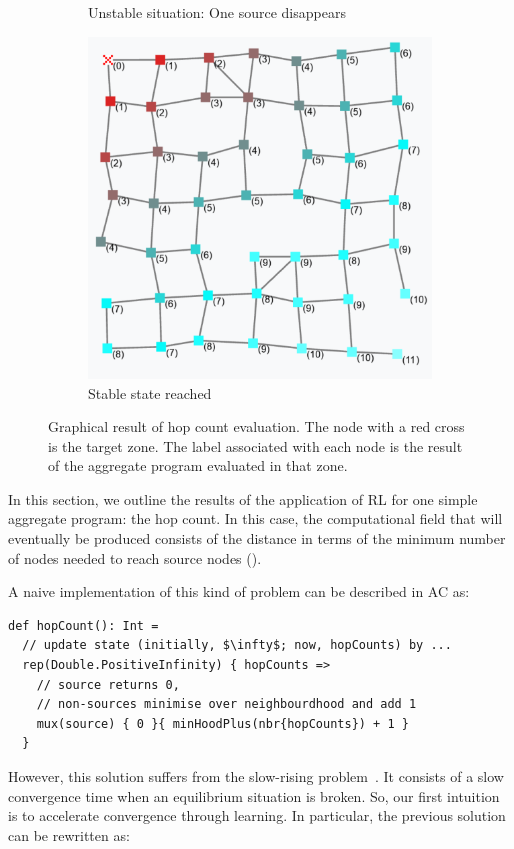 \documentclass[conference]{IEEEtran}
\begin{document}
\begin{figure}[h]
\begin{subfigure}[b]{0.32\textwidth}
      \caption{Unstable situation: One source disappears}
  \end{subfigure}
  \hfill
  \begin{subfigure}[b]{0.32\textwidth}
      \centering
      \includegraphics[width=\textwidth]{img/hop-count-3.png}
      \caption{Stable state reached}
  \end{subfigure}
  \caption{Graphical result of hop count evaluation. The node with a red cross is the target zone. The label 
  associated with each node is the result of the aggregate program evaluated in that zone.}
  \label{fig:hop-count}
\end{figure}
In this section, we outline the results of the application of RL for one simple
 aggregate program: the hop count. In this case, the computational field that will eventually be produced consists of the distance in terms of the minimum number of nodes needed to reach source nodes ().

A naive implementation of this kind of problem can be described in AC as:
\begin{verbatim}
def hopCount(): Int = 
  // update state (initially, $\infty$; now, hopCounts) by ...
  rep(Double.PositiveInfinity) { hopCounts => 
    // source returns 0,
    // non-sources minimise over neighbourdhood and add 1
    mux(source) { 0 }{ minHoodPlus(nbr{hopCounts}) + 1 }
  }
\end{verbatim}
However, this solution suffers from the slow-rising problem~\cite{DBLP:conf/saso/AudritoCDV17}. 
 It consists of a slow convergence time when an equilibrium situation is broken.
So, our first intuition is to accelerate convergence through learning.
 In particular, the previous solution can be rewritten as:
\end{document}
